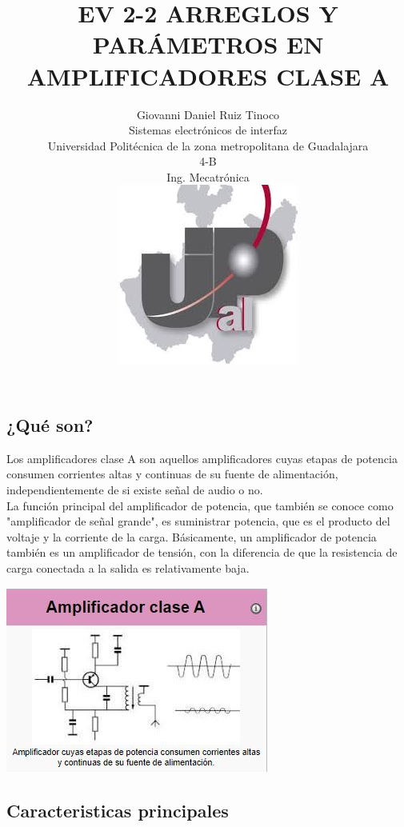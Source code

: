 \documentclass[12pt,a4paper]{article}
\title{EV 2-2 ARREGLOS Y PARÁMETROS EN AMPLIFICADORES CLASE A}
\author{Giovanni Daniel Ruiz Tinoco\\
\small Sistemas electrónicos de interfaz\\
  \small Universidad Politécnica de la zona metropolitana de Guadalajara\\
  \small 4-B \\
  \small Ing. Mecatrónica\\
\centering
\includegraphics[scale=2]{imagenes/upz.jpg} 
}
\begin{document}
\maketitle
\newpage
\begin{center}
\section {¿Qué son?}
\end{center}
Los amplificadores clase A son aquellos amplificadores cuyas etapas de potencia consumen corrientes altas y continuas de su fuente de alimentación, independientemente de si existe señal de audio o no.\\
La función principal del amplificador de potencia, que también se conoce como "amplificador de señal grande", es suministrar potencia, que es el producto del voltaje y la corriente de la carga. Básicamente, un amplificador de potencia también es un amplificador de tensión, con la diferencia de que la resistencia de carga conectada a la salida es relativamente baja.
\begin{center}
\includegraphics[scale=1.5]{imagenes/ampli.JPG} 
\subsection{Caracteristicas principales}
\end{center}
\end{document}
